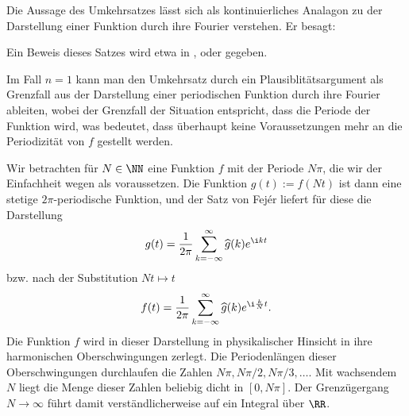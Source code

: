 \begin{antwort}
  Die Aussage des Umkehrsatzes lässt sich als kontinuierliches Analagon 
  zu der Darstellung einer Funktion durch ihre Fourier 
  verstehen. Er besagt:

  \medskip%
  \noindent%

  \medskip\noindent
  Ein Beweis dieses Satzes wird etwa in \citep{Koenig}, 
  \citep{Forster} oder \citep{Rudin} gegeben.

  Im Fall $n=1$ kann man den Umkehrsatz 
  durch ein Plausiblitätsargument 
  als Grenzfall aus der Darstellung einer periodischen 
  Funktion durch ihre Fourier ableiten,  
  wobei der Grenzfall der Situation entspricht, dass die 
  Periode der Funktion  wird, was 
  bedeutet, dass überhaupt keine Voraussetzungen mehr an 
  die Periodizität von $f$ gestellt werden.

  Wir betrachten für $N\in \NN$ eine Funktion $f$ mit der Periode 
  $N\pi$, die wir der Einfachheit wegen als  voraussetzen.  
  Die Funktion $g(t) := f(Nt)$ ist dann eine stetige $2\pi$-periodische 
  Funktion, und der Satz von Fej\'er liefert für diese die Darstellung 
  \[
  g(t) = \frac{1}{2\pi} \sum_{k=-\infty}^\infty \widehat{g}(k) e^{\i k t}
  \]
  bzw. nach der Substitution $Nt \mapsto t$
  \[
  f(t) = \frac{1}{2\pi} \sum_{k=-\infty}^\infty \widehat{g}(k) 
  e^{\i\frac{k}{N} t}.
  \]
  Die Funktion $f$ wird in dieser Darstellung in physikalischer Hinsicht 
  in ihre harmonischen Oberschwingungen zerlegt. 
  Die Periodenlängen dieser Oberschwingungen 
  durchlaufen die Zahlen $N\pi, N\pi/2, N\pi/3, \ldots$. 
  Mit wachsendem $N$ liegt die Menge dieser Zahlen beliebig dicht in 
  $[0,N\pi]$. Der Grenzügergang $N\to\infty$ führt damit 
  verständlicherweise auf ein Integral über $\RR$. 


\end{antwort}
